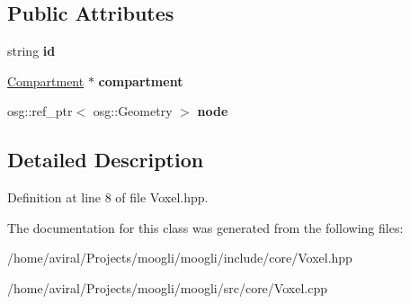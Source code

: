 \subsection*{Public Attributes}
\begin{DoxyCompactItemize}
\item 
\hypertarget{classVoxel_a29721ad4b3ba72ffdaf0858ceb59f1d8}{string {\bfseries id}}\label{classVoxel_a29721ad4b3ba72ffdaf0858ceb59f1d8}

\item 
\hypertarget{classVoxel_ab2e89f3ae2c8df9aa1a2b0822bdada06}{\hyperlink{classCompartment}{Compartment} $\ast$ {\bfseries compartment}}\label{classVoxel_ab2e89f3ae2c8df9aa1a2b0822bdada06}

\item 
\hypertarget{classVoxel_ac88e6ca57921bfd8e9cfe3d997d3b780}{osg\-::ref\-\_\-ptr$<$ osg\-::\-Geometry $>$ {\bfseries node}}\label{classVoxel_ac88e6ca57921bfd8e9cfe3d997d3b780}

\end{DoxyCompactItemize}


\subsection{Detailed Description}


Definition at line 8 of file Voxel.\-hpp.



The documentation for this class was generated from the following files\-:\begin{DoxyCompactItemize}
\item 
/home/aviral/\-Projects/moogli/moogli/include/core/Voxel.\-hpp\item 
/home/aviral/\-Projects/moogli/moogli/src/core/Voxel.\-cpp\end{DoxyCompactItemize}
